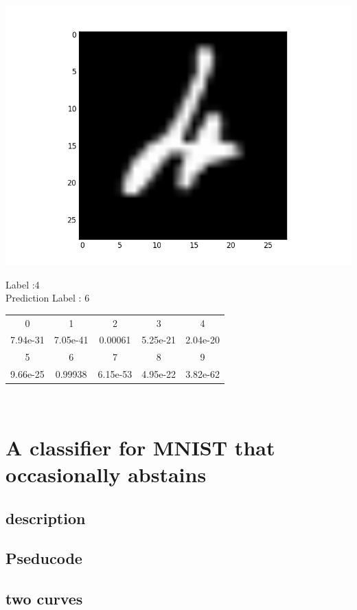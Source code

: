 \documentclass{article}
\begin{document}
\noindent\begin{minipage}{0.5\textwidth}
	\includegraphics[width=\linewidth]{hw3_f8}
\end{minipage}%
\hfill%
\begin{minipage}{0.5\textwidth}
	Label :4\\
	Prediction Label : 6\\
	\begin{tabular}{ | c | c | c | c | c | }
		\hline
		0 & 1 & 2 & 3 & 4 \\		
7.94e-31 &
7.05e-41 &
0.00061 &
5.25e-21 &
2.04e-20 \\
		\hline
		5 & 6 & 7 & 8 & 9 \\
9.66e-25 &
0.99938 &
6.15e-53 &
4.95e-22 &
3.82e-62 \\
		\hline
	\end{tabular}\\
\end{minipage}


\section{A classifier for MNIST that occasionally abstains}
\subsection{description}
\subsection{Pseducode}
\subsection{two curves}
\end{document}
